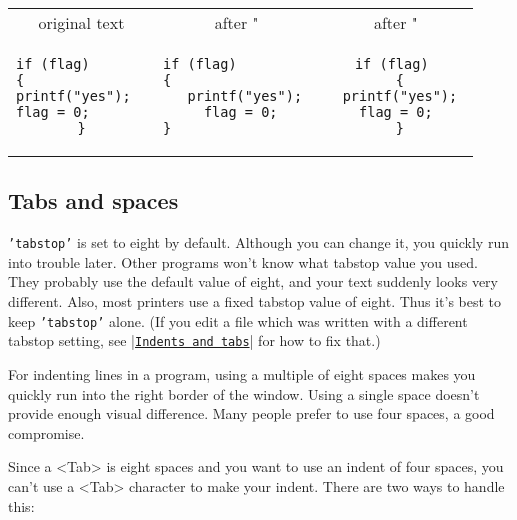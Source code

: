 {%
\begin{center} \begin{tabular}{|c|c|c|}
				\hline
				original text & after "\texttt{>i\{\}" & after "\texttt{>a\{\}" \\ 
				\begin{minipage}{4cm}
				\begin{verbatim}
if (flag)       
{               
printf("yes");  
flag = 0;       
}
				\end{verbatim}
				\end{minipage}
& 
				\begin{minipage}{4cm}
				\begin{verbatim}
if (flag)         
{                 
  printf("yes");
  flag = 0; 
}                 
				\end{verbatim}
				\end{minipage}
&
				\begin{minipage}{4cm}
				\begin{verbatim}
if (flag) 
  { 
  printf("yes"); 
  flag = 0;  
  } 
				\end{verbatim}
				\end{minipage} \\
				\hline
\end{tabular} \end{center}
\subsection{Tabs and spaces}
\texttt{'tabstop'} is set to eight by default.
Although you can change it, you quickly run into trouble later.
Other programs won't know what tabstop value you used.
They probably use the default value of eight, and your text suddenly looks very different.
Also, most printers use a fixed tabstop value of eight.
Thus it's best to keep \texttt{'tabstop'} alone.
(If you edit a file which was written with a different tabstop setting, see |\hyperref[Indents and tabs]{\texttt{Indents and tabs}}| for how to fix that.)

For indenting lines in a program, using a multiple of eight spaces makes you quickly run into the right border of the window.
Using a single space doesn't provide enough visual difference.
Many people prefer to use four spaces, a good compromise.

Since a <Tab> is eight spaces and you want to use an indent of four spaces, you can't use a <Tab> character to make your indent.
There are two ways to handle this:

}
